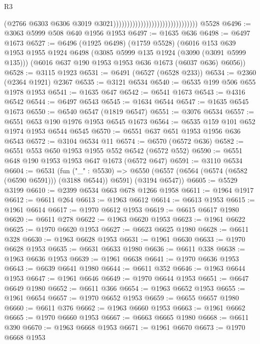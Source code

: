 \begin{lexlean}{R3}
\begin{coremodule}
                                                                (@2766
                                                                  @6303
                                                                  @6306
                                                                  @3019
                                                                  @3021)))))))))))))))))))))))))))))))
    @5528
@6496 := @3063 @5999 @508 @640 @1956 @1953
@6497 := @1635 @636
@6498 := @6497 @1673
@6527 := @6496
    (@1925 @6498)
    (@1759 @5528)
    (@6016
      @153
      @639
      @1953
      @1955
      @1924
      @6498
      (@3085 @5999 @135 @1924 (@3090 (@3091 @5999 @135)))
      (@6016 @637 @190 @1953 @1953 @636 @1673 (@6037 @636) @6056))
@6528 := @3115 @1923
@6531 := @6491 (@6527 (@6528 @233))
@6534 := @2360 (@2364 @1921) @2367
@6535 := @3121 @6534
@6540 := @6535 @199 @506 @655 @1978 @1953
@6541 := @1635 @647
@6542 := @6541 @1673
@6543 := @4316 @6542
@6544 := @6497 @6543
@6545 := @1634 @6544
@6547 := @1635 @6545 @1673
@6550 := @6540 @6547 (@1819 @6547)
@6551 := @3076 @6534
@6557 := @6551 @653 @190 @1976 @1953 @6545 @1673
@6564 := @6535 @159 @101 @652 @1974 @1953 @6544 @6545
@6570 := @6551 @637 @651 @1953 @1956 @636 @6543
@6572 := @3104 @6534 @11
@6574 := @6570 (@6572 @636)
@6582 := @6551 @553 @650 @1953 @1955 @552 @6542 (@6572 @552)
@6590 := @6551 @648 @190 @1953 @1953 @647 @1673 (@6572 @647)
@6591 := @3110 @6534
@6604 := @6531
    (fun ("_" : @5530) =>
    @6550 (@6557 (@6564 (@6574 (@6582 (@6590 @6591))) (@3188 @6544)) @6591) (@3194 @6547))
@6605 := @5529 @3199
@6610 := @2399 @6534 @663 @678 @1266 @1958
@6611 := @1964 @1917
@6612 := @6611 @264
@6613 := @1963 @6612
@6614 := @6613 @1953
@6615 := @1961 @6614
@6617 := @1970 @6612 @1953
@6619 := @6615 @6617 @1980
@6620 := @6611 @278
@6622 := @1963 @6620 @1953
@6623 := @1961 @6622
@6625 := @1970 @6620 @1953
@6627 := @6623 @6625 @1980
@6628 := @6611 @328
@6630 := @1963 @6628 @1953
@6631 := @1961 @6630
@6633 := @1970 @6628 @1953
@6635 := @6631 @6633 @1980
@6636 := @6611 @338
@6638 := @1963 @6636 @1953
@6639 := @1961 @6638
@6641 := @1970 @6636 @1953
@6643 := @6639 @6641 @1980
@6644 := @6611 @352
@6646 := @1963 @6644 @1953
@6647 := @1961 @6646
@6649 := @1970 @6644 @1953
@6651 := @6647 @6649 @1980
@6652 := @6611 @366
@6654 := @1963 @6652 @1953
@6655 := @1961 @6654
@6657 := @1970 @6652 @1953
@6659 := @6655 @6657 @1980
@6660 := @6611 @376
@6662 := @1963 @6660 @1953
@6663 := @1961 @6662
@6665 := @1970 @6660 @1953
@6667 := @6663 @6665 @1980
@6668 := @6611 @390
@6670 := @1963 @6668 @1953
@6671 := @1961 @6670
@6673 := @1970 @6668 @1953

\end{coremodule}
\end{lexlean}

